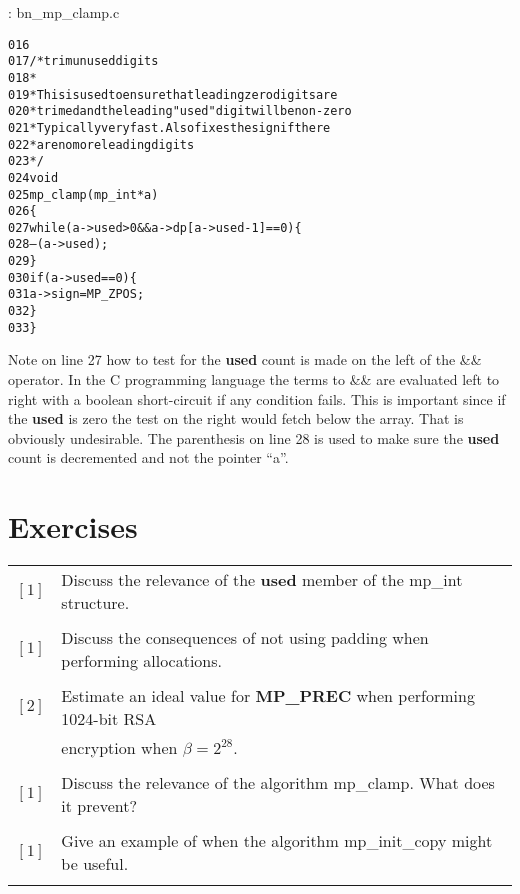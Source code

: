 \documentclass[b5paper]{book}
\begin{document}
\vspace{+3mm}\begin{small}
\hspace{-5.1mm}{\bf File}: bn\_mp\_clamp.c
\vspace{-3mm}
\begin{alltt}
016   
017   /* trim unused digits 
018    *
019    * This is used to ensure that leading zero digits are
020    * trimed and the leading "used" digit will be non-zero
021    * Typically very fast.  Also fixes the sign if there
022    * are no more leading digits
023    */
024   void
025   mp_clamp (mp_int * a)
026   \{
027     while (a->used > 0 && a->dp[a->used - 1] == 0) \{
028       --(a->used);
029     \}
030     if (a->used == 0) \{
031       a->sign = MP_ZPOS;
032     \}
033   \}
\end{alltt}
\end{small}

Note on line 27 how to test for the \textbf{used} count is made on the left of the \&\& operator.  In the C programming
language the terms to \&\& are evaluated left to right with a boolean short-circuit if any condition fails.  This is 
important since if the \textbf{used} is zero the test on the right would fetch below the array.  That is obviously 
undesirable.  The parenthesis on line 28 is used to make sure the \textbf{used} count is decremented and not
the pointer ``a''.  

\section*{Exercises}
\begin{tabular}{cl}
$\left [ 1 \right ]$ & Discuss the relevance of the \textbf{used} member of the mp\_int structure. \\
                     & \\
$\left [ 1 \right ]$ & Discuss the consequences of not using padding when performing allocations.  \\
                     & \\
$\left [ 2 \right ]$ & Estimate an ideal value for \textbf{MP\_PREC} when performing 1024-bit RSA \\
                     & encryption when $\beta = 2^{28}$.  \\
                     & \\
$\left [ 1 \right ]$ & Discuss the relevance of the algorithm mp\_clamp.  What does it prevent? \\
                     & \\
$\left [ 1 \right ]$ & Give an example of when the algorithm  mp\_init\_copy might be useful. \\
                     & \\
\end{tabular}
\end{document}
